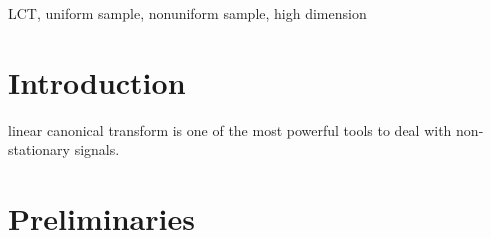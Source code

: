 \documentclass[journal]{IEEEtran}
\begin{document}
\begin{IEEEkeywords}
	LCT, uniform sample, nonuniform sample, high dimension
\end{IEEEkeywords}


\IEEEpeerreviewmaketitle



\section{Introduction}

 linear canonical transform is one of the most powerful tools to deal with non-stationary signals.



\section{Preliminaries}
\end{document}
